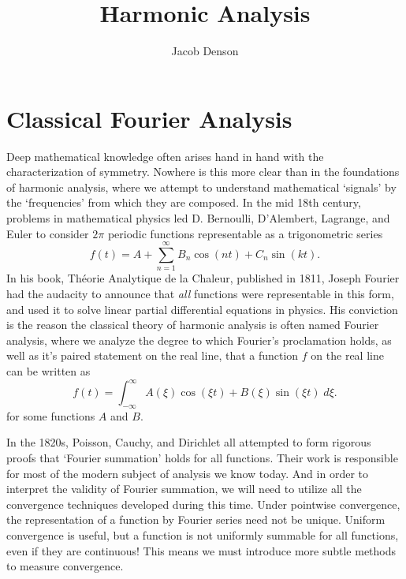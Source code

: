 

\title{Harmonic Analysis}
\author{Jacob Denson}



\maketitle
\tableofcontents
{}

\part{Classical Fourier Analysis}

Deep mathematical knowledge often arises hand in hand with the characterization of symmetry. Nowhere is this more clear than in the foundations of harmonic analysis, where we attempt to understand mathematical `signals' by the `frequencies' from which they are composed. In the mid 18th century, problems in mathematical physics led D. Bernoulli, D'Alembert, Lagrange, and Euler to consider $2 \pi$ periodic functions representable as a trigonometric series
%
\[ f(t) = A + \sum_{n = 1}^\infty B_n \cos(nt) + C_n \sin(kt). \]
%
In his book, Th\'{e}orie Analytique de la Chaleur, published in 1811, Joseph Fourier had the audacity to announce that {\it all} functions were representable in this form, and used it to solve linear partial differential equations in physics. His conviction is the reason the classical theory of harmonic analysis is often named Fourier analysis, where we analyze the degree to which Fourier's proclamation holds, as well as it's paired statement on the real line, that a function $f$ on the real line can be written as
%
\[ f(t) = \int_{-\infty}^\infty A(\xi) \cos(\xi t) + B(\xi) \sin(\xi t)\; d\xi. \]
%
for some functions $A$ and $B$.

In the 1820s, Poisson, Cauchy, and Dirichlet all attempted to form rigorous proofs that `Fourier summation' holds for all functions. Their work is responsible for most of the modern subject of analysis we know today. And in order to interpret the validity of Fourier summation, we will need to utilize all the convergence techniques developed during this time. Under pointwise convergence, the representation of a function by Fourier series need not be unique. Uniform convergence is useful, but a function is not uniformly summable for all functions, even if they are continuous! This means we must introduce more subtle methods to measure convergence.

